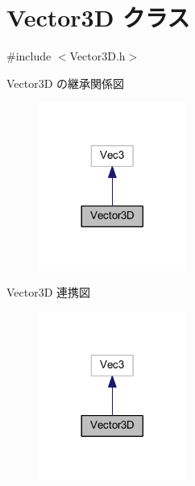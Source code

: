 \hypertarget{class_vector3_d}{}\section{Vector3D クラス}
\label{class_vector3_d}


{\ttfamily \#include $<$Vector3\+D.\+h$>$}



Vector3D の継承関係図\nopagebreak
\begin{figure}[H]
\begin{center}
\leavevmode
\includegraphics[width=137pt]{class_vector3_d__inherit__graph}
\end{center}
\end{figure}


Vector3D 連携図\nopagebreak
\begin{figure}[H]
\begin{center}
\leavevmode
\includegraphics[width=137pt]{class_vector3_d__coll__graph}
\end{center}
\end{figure}
